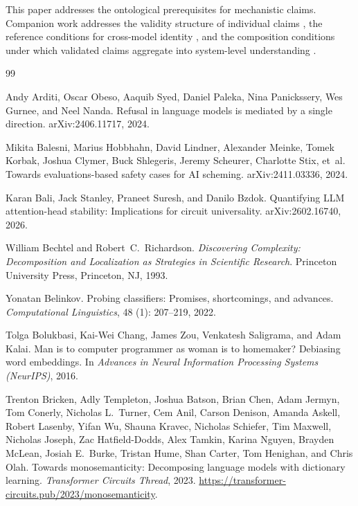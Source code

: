\documentclass{article}
\begin{document}
This paper addresses the ontological prerequisites for mechanistic
claims.  Companion work addresses the validity structure of individual
claims \citep{tower2026mechvalidity}, the reference conditions for
cross-model identity \citep{tower2026mechreference}, and the composition
conditions under which validated claims aggregate into system-level
understanding \citep{tower2026mechknowledge}.

\begin{thebibliography}{99}

Andy Arditi, Oscar Obeso, Aaquib Syed, Daniel Paleka, Nina Panickssery, Wes Gurnee,
  and Neel Nanda.
\newblock Refusal in language models is mediated by a single direction.
\newblock arXiv:2406.11717, 2024.

Mikita Balesni, Marius Hobbhahn, David Lindner, Alexander Meinke, Tomek
  Korbak, Joshua Clymer, Buck Shlegeris, Jeremy Scheurer, Charlotte Stix,
  et~al.
\newblock Towards evaluations-based safety cases for {AI} scheming.
\newblock arXiv:2411.03336, 2024.

Karan Bali, Jack Stanley, Praneet Suresh, and Danilo Bzdok.
\newblock Quantifying {LLM} attention-head stability: Implications for circuit
  universality.
\newblock arXiv:2602.16740, 2026.

William Bechtel and Robert~C.\ Richardson.
\newblock \emph{Discovering Complexity: Decomposition and Localization as
  Strategies in Scientific Research}.
\newblock Princeton University Press, Princeton, NJ, 1993.

Yonatan Belinkov.
\newblock Probing classifiers: Promises, shortcomings, and advances.
\newblock \emph{Computational Linguistics}, 48 (1): 207--219, 2022.

Tolga Bolukbasi, Kai-Wei Chang, James Zou, Venkatesh Saligrama, and Adam Kalai.
\newblock Man is to computer programmer as woman is to homemaker? Debiasing word
  embeddings.
\newblock In \emph{Advances in Neural Information Processing Systems (NeurIPS)}, 2016.

Trenton Bricken, Adly Templeton, Joshua Batson, Brian Chen, Adam Jermyn,
  Tom Conerly, Nicholas L.\ Turner, Cem Anil, Carson Denison, Amanda Askell,
  Robert Lasenby, Yifan Wu, Shauna Kravec, Nicholas Schiefer, Tim Maxwell,
  Nicholas Joseph, Zac Hatfield-Dodds, Alex Tamkin, Karina Nguyen, Brayden
  McLean, Josiah E.\ Burke, Tristan Hume, Shan Carter, Tom Henighan, and
  Chris Olah.
\newblock Towards monosemanticity: Decomposing language models with dictionary
  learning.
\newblock \emph{Transformer Circuits Thread}, 2023.
\newblock \url{https://transformer-circuits.pub/2023/monosemanticity}.


\end{thebibliography}
\end{document}
